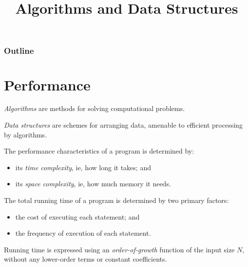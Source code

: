 \documentclass[8pt,a4paper,compress,handout]{beamer}
\title{Algorithms and Data Structures}
\date{}
\begin{document}
\begin{frame}
\vfill
\titlepage
\end{frame}

\begin{frame}
\frametitle{Outline}
\tableofcontents
\end{frame}

\section{Performance}
\begin{frame}[fragile]
\emph{Algorithms} are methods for solving computational problems.

\bigskip

\emph{Data structures} are schemes for arranging data, amenable to efficient processing by algorithms.

\bigskip

The performance characteristics of a program is determined by: 
\begin{itemize}
\item its \emph{time complexity}, ie, how long it takes; and 

\item its \emph{space complexity}, ie, how much memory it needs.
\end{itemize}

\bigskip

The total running time of a program is determined by two primary factors:
\begin{itemize}
\item the cost of executing each statement; and 
\item the frequency of execution of each statement.
\end{itemize}

\bigskip

Running time is expressed using an \emph{order-of-growth} function of the input size $N$, without any lower-order terms or constant coefficients.
\end{frame}
\end{document}
